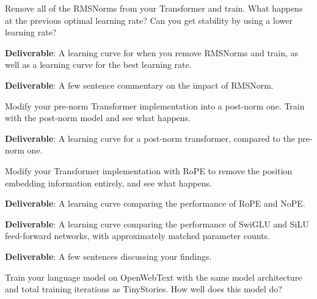 Remove all of the RMSNorms from your Transformer and train. What happens at the previous optimal learning rate? Can you get stability by using a lower learning rate?

\textbf{Deliverable}: A learning curve for when you remove RMSNorms and train, as well as a learning curve for the best learning rate.

\textbf{Deliverable}: A few sentence commentary on the impact of RMSNorm.

\begin{answer}

\end{answer}


Modify your pre-norm Transformer implementation into a post-norm one. Train with the post-norm model and see what happens.

\textbf{Deliverable}: A learning curve for a post-norm transformer, compared to the pre-norm one.

\begin{answer}

\end{answer}


Modify your Transformer implementation with RoPE to remove the position embedding information entirely, and see what happens.

\textbf{Deliverable}: A learning curve comparing the performance of RoPE and NoPE.

\begin{answer}

\end{answer}


\textbf{Deliverable}: A learning curve comparing the performance of SwiGLU and SiLU feed-forward networks, with approximately matched parameter counts.

\textbf{Deliverable}: A few sentences discussing your findings.

\begin{answer}

\end{answer}


Train your language model on OpenWebText with the same model architecture and total training iterations as TinyStories. How well does this model do?

